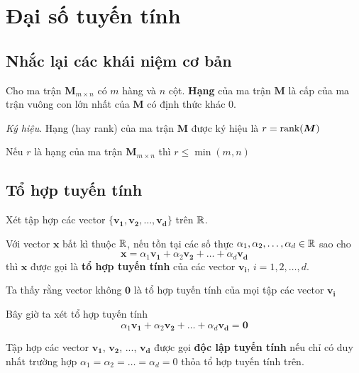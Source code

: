 \chapter{Đại số tuyến tính}

\section{Nhắc lại các khái niệm cơ bản}

\begin{definition}
    
    Cho ma trận $\bm{M}_{m \times n}$ có $m$ hàng và $n$ cột. \textbf{Hạng} của ma trận $\bm{M}$ là cấp của ma trận vuông con lớn nhất của $\bm{M}$ có định thức khác 0.

    \textit{Ký hiệu}. Hạng (hay rank) của ma trận $\bm{M}$ được ký hiệu là $r = \text{rank}(\bm{M})$

\end{definition}

\begin{remark}
    Nếu $r$ là hạng của ma trận $\bm{M}_{m \times n}$ thì $r \leq \min (m, n)$
\end{remark}

\section{Tổ hợp tuyến tính}

Xét tập hợp các vector $\{\bm{v_1}, \bm{v_2}, \ldots, \bm{v_d}\}$ trên $\mathbb{R}$.

\begin{definition}
Với vector $\bm{x}$ bất kì thuộc $\mathbb{R}$, nếu tồn tại các số thực $\alpha_1, \alpha_2, \ldots, \alpha_d \in \mathbb{R}$ sao cho
\[\bm{x} = \alpha_1 \bm{v_1} + \alpha_2 \bm{v_2} + \ldots + \alpha_d \bm{v_d}\]
thì $\bm{x}$ được gọi là \textbf{tổ hợp tuyến tính} của các vector $\bm{v_i}$, $i = 1, 2, \ldots, d$.
\end{definition}

Ta thấy rằng vector không $\bm{0}$ là tổ hợp tuyến tính của mọi tập các vector $\bm{v_i}$

Bây giờ ta xét tổ hợp tuyến tính
\[\alpha_1 \bm{v_1} + \alpha_2 \bm{v_2} + \ldots + \alpha_d \bm{v_d} = \bm{0}\]

\begin{definition}
    Tập hợp các vector $\bm{v_1}$, $\bm{v_2}$, ..., $\bm{v_d}$ được gọi \textbf{độc lập tuyến tính} nếu
    chỉ có duy nhất trường hợp $\alpha_1 = \alpha_2 = \ldots = \alpha_d = 0$ thỏa tổ hợp tuyến tính trên.    
\end{definition}

